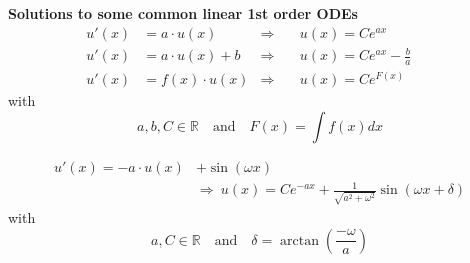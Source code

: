 \textbf{Solutions to some common linear 1st order ODEs}
\begin{align*}
    u'(x) & = a \cdot u(x)     & \Rightarrow & \quad u(x)=Ce^{ax}             &  &   \\
    u'(x) & = a \cdot u(x) + b & \Rightarrow & \quad u(x)=Ce^{ax}-\frac{b}{a} &  &   \\
    u'(x) & = f(x) \cdot u(x)  & \Rightarrow & \quad u(x) = Ce^{F(x)}         &  & 
\end{align*}
with
\begin{equation*}
    a,b,C \in \mathbb{R} \quad \text{and} \quad F(x) = \int f(x)dx
\end{equation*}

\begin{align*}
    u'(x) = -a\cdot u(x) & + \sin(\omega x)                                                                    \\
                         & \Rightarrow \: u(x)=Ce^{-ax}+\frac{1}{\sqrt{a^2 + \omega^2}}\sin(\omega x + \delta)
\end{align*}
with
\begin{equation*}
    a, C \in \mathbb{R} \quad \text{and} \quad  \delta = \arctan\left(\frac{-\omega}{a}\right)
\end{equation*}


